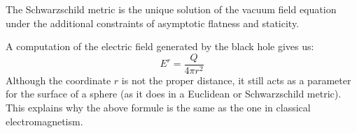 	\begin{theorem}[Birkhoff]
	    	The Schwarzschild metric is the unique solution of the vacuum field equation under the additional constraints of asymptotic flatness and staticity.
	\end{theorem}
	
	
	\begin{remark}
		A computation of the electric field generated by the black hole gives us:
		\begin{equation}
			E^r = \frac{Q}{4\pi r^2}
		\end{equation}
		Although the coordinate $r$ is not the proper distance, it still acts as a parameter for the surface of a sphere (as it does in a Euclidean or Schwarzschild metric). This explains why the above formule is the same as the one in classical electromagnetism.
	\end{remark}
